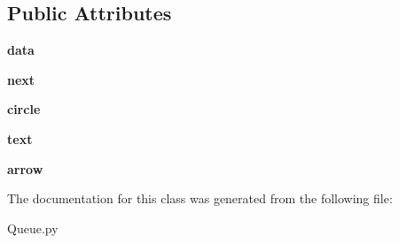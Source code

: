\subsection*{Public Attributes}
\begin{DoxyCompactItemize}
\item 
{\bfseries data}\hypertarget{class_queue_1_1_queue_node_aa9448b7ef31d8dd61adb504ccf7b1c44}{}\label{class_queue_1_1_queue_node_aa9448b7ef31d8dd61adb504ccf7b1c44}

\item 
{\bfseries next}\hypertarget{class_queue_1_1_queue_node_a736cdbadd2c72609a9964dd149054db0}{}\label{class_queue_1_1_queue_node_a736cdbadd2c72609a9964dd149054db0}

\item 
{\bfseries circle}\hypertarget{class_queue_1_1_queue_node_ac113a4d52ea51f0c6fcb65b30e6e0761}{}\label{class_queue_1_1_queue_node_ac113a4d52ea51f0c6fcb65b30e6e0761}

\item 
{\bfseries text}\hypertarget{class_queue_1_1_queue_node_a3e732e4728a03dd3c333782519efb320}{}\label{class_queue_1_1_queue_node_a3e732e4728a03dd3c333782519efb320}

\item 
{\bfseries arrow}\hypertarget{class_queue_1_1_queue_node_a762acb0de1bf2321d766376c383ffbb0}{}\label{class_queue_1_1_queue_node_a762acb0de1bf2321d766376c383ffbb0}

\end{DoxyCompactItemize}


The documentation for this class was generated from the following file\+:\begin{DoxyCompactItemize}
\item 
Queue.\+py\end{DoxyCompactItemize}
